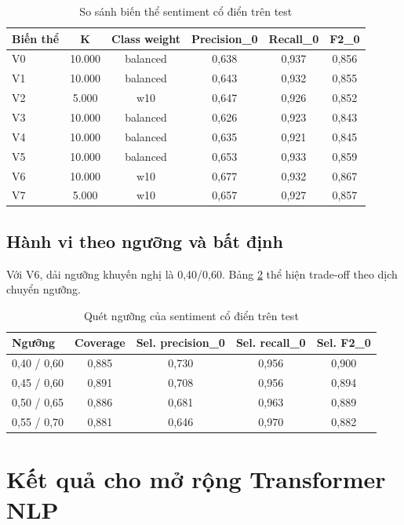 ﻿\documentclass[12pt,a4paper]{article}
\begin{document}
\begin{table}[H]
\centering
\caption{So sánh biến thể sentiment cổ điển trên test}
\label{tab:classic_variants_vi}
\begin{tabular}{lccccc}
\toprule
Biến thể & K & Class weight & Precision\_0 & Recall\_0 & F2\_0 \\
\midrule
V0 & 10.000 & balanced & 0,638 & 0,937 & 0,856 \\
V1 & 10.000 & balanced & 0,643 & 0,932 & 0,855 \\
V2 & 5.000 & w10 & 0,647 & 0,926 & 0,852 \\
V3 & 10.000 & balanced & 0,626 & 0,923 & 0,843 \\
V4 & 10.000 & balanced & 0,635 & 0,921 & 0,845 \\
V5 & 10.000 & balanced & 0,653 & 0,933 & 0,859 \\
V6 & 10.000 & w10 & 0,677 & 0,932 & 0,867 \\
V7 & 5.000 & w10 & 0,657 & 0,927 & 0,857 \\
\bottomrule
\end{tabular}
\end{table}

\subsection{Hành vi theo ngưỡng và bất định}
Với V6, dải ngưỡng khuyến nghị là 0,40/0,60. Bảng \ref{tab:classic_threshold_vi} thể hiện trade-off theo dịch chuyển ngưỡng.

\begin{table}[H]
\centering
\caption{Quét ngưỡng của sentiment cổ điển trên test}
\label{tab:classic_threshold_vi}
\begin{tabular}{lcccc}
\toprule
Ngưỡng & Coverage & Sel. precision\_0 & Sel. recall\_0 & Sel. F2\_0 \\
\midrule
0,40 / 0,60 & 0,885 & 0,730 & 0,956 & 0,900 \\
0,45 / 0,60 & 0,891 & 0,708 & 0,956 & 0,894 \\
0,50 / 0,65 & 0,886 & 0,681 & 0,963 & 0,889 \\
0,55 / 0,70 & 0,881 & 0,646 & 0,970 & 0,882 \\
\bottomrule
\end{tabular}
\end{table}

\section{Kết quả cho mở rộng Transformer NLP}
\end{document}
